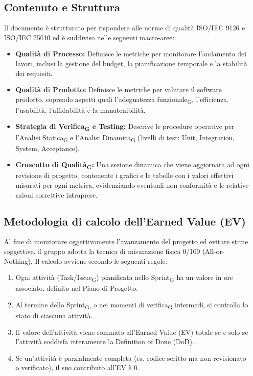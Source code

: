 \documentclass[11pt,a4paper]{article}
\newcommand{\gls}[1]{#1\textsubscript{G}}
\begin{document}
\subsection{Contenuto e Struttura}
Il documento è strutturato per rispondere alle norme di qualità ISO/IEC 9126 e ISO/IEC 25010 ed è suddiviso nelle seguenti macro-aree:
\begin{itemize}
    \item \textbf{Qualità di Processo:} Definisce le metriche per monitorare l'andamento dei lavori, inclusi la gestione del budget, la pianificazione temporale e la stabilità dei requisiti.
    \item \textbf{Qualità di Prodotto:} Definisce le metriche per valutare il software prodotto, coprendo aspetti quali l'\gls{adeguatezza funzionale}, l'efficienza, l'usabilità, l'affidabilità e la manutenibilità.
    \item \textbf{Strategia di \gls{Verifica} e Testing:} Descrive le procedure operative per l'\gls{Analisi Statica} e l'\gls{Analisi Dinamica} (livelli di test: Unit, Integration, System, Acceptance).
    \item \textbf{\gls{Cruscotto di Qualità}:} Una sezione dinamica che viene aggiornata ad ogni revisione di progetto, contenente i grafici e le tabelle con i valori effettivi misurati per ogni metrica, evidenziando eventuali non conformità e le relative azioni correttive intraprese.
\end{itemize}

\subsection{Metodologia di calcolo dell'Earned Value (EV)}
Al fine di monitorare oggettivamente l'avanzamento del progetto ed evitare stime soggettive, il gruppo adotta la tecnica di misurazione fisica 0/100 (All-or-Nothing).
Il calcolo avviene secondo le seguenti regole: 
\begin{enumerate} 
    \item Ogni attività (Task/\gls{Issue}) pianificata nello \gls{Sprint} ha un valore in ore associato, definito nel Piano di Progetto.
    \item Al termine dello \gls{Sprint}, o nei momenti di \gls{verifica} intermedi, si controlla lo stato di ciascuna attività. 
    \item Il valore dell'attività viene sommato all'Earned Value (EV) totale se e solo se l'attività soddisfa interamente la Definition of Done (DoD). \item Se un'attività è parzialmente completa (es. codice scritto ma non revisionato o verificato), il suo contributo all'EV è 0.
\end{enumerate} 
\end{document}
